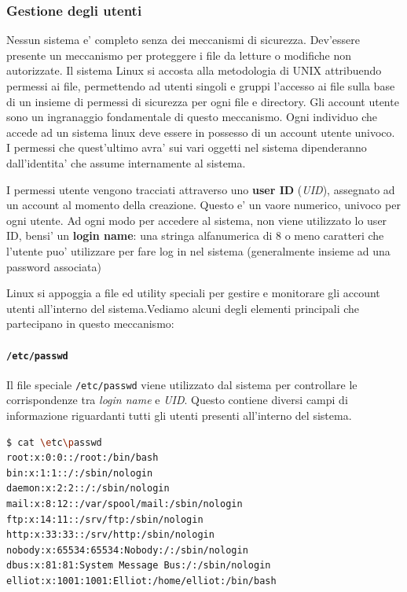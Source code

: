 \subsubsection{Gestione degli utenti}
Nessun sistema e' completo senza dei meccanismi di sicurezza. Dev'essere presente un meccanismo per proteggere i file da letture o modifiche non autorizzate. Il sistema Linux si accosta  alla metodologia di UNIX attribuendo permessi ai file, permettendo ad utenti singoli e gruppi l'accesso ai file sulla base di un insieme di permessi di sicurezza per ogni file e directory. Gli account utente sono un ingranaggio fondamentale di questo meccanismo. Ogni individuo che accede ad un sistema linux deve essere in possesso di un account utente univoco. I permessi che quest'ultimo avra' sui vari oggetti nel sistema dipenderanno dall'identita' che assume internamente al sistema.

I permessi utente vengono tracciati attraverso uno \textbf{user ID} (\emph{UID}), assegnato ad un account al momento della creazione. Questo e' un vaore numerico, univoco per ogni utente. Ad ogni modo per accedere al sistema, non viene utilizzato lo user ID, bensi' un \textbf{login name}: una stringa alfanumerica di 8 o meno caratteri che l'utente puo' utilizzare per fare log in nel sistema (generalmente insieme ad una password associata)

Linux si appoggia a file ed utility speciali per gestire e monitorare gli account utenti all'interno del sistema.Vediamo alcuni degli elementi principali che partecipano in questo meccanismo:

\paragraph{\texttt{/etc/passwd}} Il file speciale \texttt{/etc/passwd} viene utilizzato dal sistema per controllare le corrispondenze tra \emph{login name} e \emph{UID}. Questo contiene diversi campi di informazione riguardanti tutti gli utenti presenti all'interno del sistema.

\begin{lstlisting}[language=bash,basicstyle=\ttfamily,frame=single,caption={Struttura di un file /etc/passwd},captionpos=b]
$ cat \etc\passwd
root:x:0:0::/root:/bin/bash
bin:x:1:1::/:/sbin/nologin
daemon:x:2:2::/:/sbin/nologin
mail:x:8:12::/var/spool/mail:/sbin/nologin
ftp:x:14:11::/srv/ftp:/sbin/nologin
http:x:33:33::/srv/http:/sbin/nologin
nobody:x:65534:65534:Nobody:/:/sbin/nologin
dbus:x:81:81:System Message Bus:/:/sbin/nologin
elliot:x:1001:1001:Elliot:/home/elliot:/bin/bash
\end{lstlisting}

